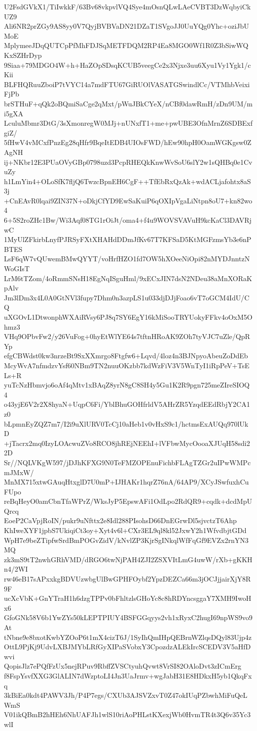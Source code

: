 U2FsdGVkX1/TiIwkkF/63Bv68vkpvlVQ4Sye4mOsnQLwLAeCVBT3DzWqbyiCkUZ9
Ali6NR2prZGy9AS8yy0V7QyjBVBVaDN21DZaT1SVgoJJ0UuYQg0Yhc+oziJbUMoE
MplymeeJDqQUTCpPfMhFDJSqMETFDQM2RP4Ea8MGO0Wf1R0Z3bSiwWQKxSZHrDyp
9Siaa+79MDGO4W+h+HaZOpSDsqKCUB5veegCe2x3Njxe3uu6Xyu1Vy1Ygk1/cKii
BLFHQRuuZboiP7tVYC14a7mdFTU67GiRUOlVASATGSwindlCc/VTMhbVeixiFjPb
brSTHuF+qQk2oBQmiSaCge2qMxt/pWuJBkCYeX/nCBf0dawRmH/zDn9UM/mi5gXA
LculuMbmr3DtG/3sXmonregW0MJj+nUNxfT1+me+pwUBE3OfnMrnZ6SDBExfgiZ/
5fHwV4vMCxfPnzEg28qHfr9BqeItEDB4UIOsFWD/hEw90hpH0OamWGKgsw0ZAgNH
ij+NKbr12E3PUaOVyGBp0798uzd3PcpRHEQkKnwWvSoU6slY2w1sQHBq0e1CvuZy
h1LmYin4+OLoSfK7fljQ6TwzcBpnEH6CgF++TfEbRxQzAk+wdACLjafohtx8aS3j
+CnEAvR0lqai9ZIN37N+oDkjCfYD9EwSaKuiP6qOXIpVgaLiNtpn8oU7+kn82wo4
6+5S2roZHc1Bw/Wi3Aqf08TG1rOiJt/oma4+f4u9WOVSVAVuH9kcKaCl3DAVRjwC
1MyUlZFkirbLnyfPJRSyFXtXHAHdDDmJfKv67T7KFSaD5KtMGFzmsYb3e6nPBTES
LsF6qW7vQUwemBMwQYYT/voHrfHZO1fd7OW5hXOeeNiOpi82nMYDJnntzNWoGIsT
LrM6tTZom/4oRmmSNsH18EgNqISguHml/9xECxJIN7dsN2NDeu38aMnXORaKpAlv
Jm3lDm3x4L0A0GtNVl3fupy7Dhm0n3azpLS1u033djDJjFoao6vT7oGCM4IdU/CQ
uXGOvL1DtwonphWXAiRVsy6PJ8q7SY6EgY16kMiSooTRYUokyFFkv4oOxM5Ohmz3
VHq9OPbvFw2/y26VuFog+0hyEtWlYE64s7tftnHRoAK9ZOh7tyVJC7uZle/QpRYp
efgCBWdst0kw3nrzeBt9SxXXmrgo8Ftgfw6+Lqvd/4loz4n3BJNpyoAbeuZoDdEb
McyWvA7nfmdzvYsf60NBm9TN2nuuOKzbb7kdWzFiV3V5WnTyI1iRpPeV+TsELs+R
yuTcNzHbmvjo6oAf4qMtv1xBAqZ8yrN8gC8SH4y5Gu1K2R9pgn725meZIreSIOQ4
o43yjE6V2r2X8hyaN+UqpC6Fi/YblBhuGOHfrldV5AHrZR5YzqdEEdRbjY2CA1z0
bLpmnEyZQZ7m7/I2i9uXlURV0TcCj10aHeb1v0vHxS9c1/hctmsExAUQq970lUkD
+jTacrx2mq0IzyLOAcwuZVo8RCO8jhREjNEEhI+lVFbwMycOooaXJUqH58sdi22D
Sr//NQLVKgW597/jDJhKFXG9N0TeFMZOPEnuFichbFLAgTZGr2uIPwWMPcmJMxW/
MnMX715xtwGAuqHtxglD7U0mP+IJHAKr1hqrZ76nA/64AP9/XCyJSwfuxhCuFUpo
reBqHeyO0amCbnTfaWPrZ/WksJyP5EpswAFi1OdLpo2RdQR9+cqdk+dcdMpUQrcq
EoeP2CaVpjRoIN/pukr9uNfttx2e8Idl288PIsohsD66DnEGrwDl5sjvctzT6Ahp
KhIweXYF1jpbS7UkiqiCt3oy+Xyt4v6l+CXr3EL9ql8kl52JxwY2h1WfvdbjtGDd
WpH7e9beZTipfwSrdBmPOGvZidV/kNvlZP3KjrSgINkqlWfFqGf9EVZx2rnYN3MQ
zk3mS9tT2nwhGRhVMD/dRGO6twNjPAH4ZJI2ZSXVItLmG4uwW/rXb+gKKHn4/2WI
rw46eB17sAPxxkgBDVUzwbgUlBwGPHFOybf2YpzDEZCa66m3jOCJjjairXjY8R9F
ucXcVbK+GnYTraH1h6dzgTPPv0bFhltzlsGHoYc8c8hRDYncsggaY7XMH9IwoHx6
GfoGNk58V6b1YwZYs50kLEPTPIUY4BSFGGqyys2vh1xRyxC2hugI69npWS9vo9At
tNbne9e8bxotKwbYZOoP6t1mX4cizT6J/1SyIhQmIHpQEBrnWZlqsDQyl83Ujp4z
OttL9PjKj9UdvLXBJMYbLRfGyXIPaSVobxY3CpozdzALEkIrcSCEDV3V5aHfDwvi
QopisJlz7ePQfFzUx5nejRPuv9RbffZVSCtyuhQvwt8VrSI82OAloDvt3zICmErg
f8FspYsvfXXG3GlALIN7dWzptoLI4Jn3UaJrmv+wgJabH31E8HDkxH5yb1QkqFxq
3kBiEa0kdt4PAWV3Jh/P4P7egs/CXUb3AJSVZxvT0Z47okIUqPZbwhMiFuQeLWmS
V01ikQBmB2hHEh6NhUAFJh1wlS10riAoPHLstKXexjWb0HvmTR4t3Q6v35Yc3wlI
